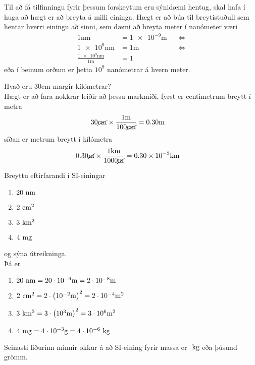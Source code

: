 Til að fá tilfinningu fyrir þessum forskeytum eru sýnidæmi hentug, skal hafa 
í huga að hægt er að breyta á milli eininga. Hægt er að búa til breytistuðull
sem hentar hverri einingu að sinni, sem dæmi að breyta meter í nanómeter væri
\begin{align*}
	\si{\num{1} \nano\meter } &= \si{\num{1e-9} \meter} && \Leftrightarrow \\
	\si{\num{1e9} \nano\meter } &= \si{\num{1} \meter} && \Leftrightarrow \\
	\frac{
		\si{\num{1e9} \nano\meter }
		}{
		\si{\num{1} \meter }
		}
		&= \si{\num{1}}
\end{align*}
eða í beinum orðum er þetta $10^9$ nanómetrar á hvern meter.

\begin{formalexample}
Hvað eru $30 \si{\centi\meter}$ margir kílómetrar?
\\[4 ex]
Hægt er að fara nokkrar leiðir að þessu markmiði, fyrst er centimetrum breytt
í metra
\begin{align*}
	\num{30 } \si{ \cancel\centi\meter} \times 
		\frac{\si{\num{1 } \meter}}{\num{100} \si{ \cancel\centi\meter}} 
		&= \si{\num{0.30} \meter}
\end{align*}
síðan er metrum breytt í kílómetra
\begin{align*}
	\num{0.30} \si{\cancel\meter} \times 
		\frac{\num{1} \si{\kilo\meter}}{\num{1000}\si{\cancel\meter}} 
		&= \si{\num{0.30e-3} \kilo\meter}
\end{align*}
\end{formalexample}


\begin{formalexample}
Breyttu eftirfarandi í SI-einingar
\begin{enumerate}
	\item $20 \textrm{ n}\textrm{m}$
	\item $2 \textrm{ c}\textrm{m}^2$
	\item $3 \textrm{ k}\textrm{m}^2$
	\item $4 \textrm{ m}\textrm{g}$
\end{enumerate}
og sýna útreikninga.
\\[4 ex]
Þá er
\begin{enumerate}
	\item $20 \textrm{ n}\textrm{m} = 20 \cdot 10^{-9} \textrm{m} = 2\cdot 10^{-8} \textrm{m}$
	\item $2 \textrm{ c}\textrm{m}^2 = 2 \cdot \left( 10^{-2} \textrm{m} \right)^2 = 2 \cdot 10^{-4} \textrm{m}^2$
	\item $3 \textrm{ k}\textrm{m}^2 = 3 \cdot \left( 10^{3} \textrm{m} \right)^2 = 3 \cdot 10^{6} \textrm{m}^2$
	\item $4 \textrm{ m}\textrm{g} = 4 \cdot 10^{-3} \textrm{g} = 4 \cdot 10^{-6} \textrm{ k}\textrm{g}$
\end{enumerate}
Seinasti liðurinn minnir okkur á að SI-eining fyrir massa er $\textrm{ k}\textrm{g}$ eða
þúsund grömm.
\end{formalexample}

